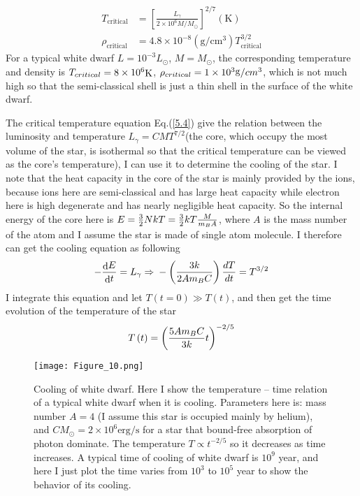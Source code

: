 \documentclass[preprint]{revtex4-1}
\begin{document}
\begin{align}
T_{\text{critical}}&=[\frac{L_{\gamma}}{2\times10^6M/M_{\odot}}]^{2/7}(\text{K}) \label{5.4}\\
\rho_{\text{critical}}&=4.8\times10^{-8}(\text{g}/\text{cm}^3)T_{\text{critical}}^{3/2} \label{5.5}
\end{align}
For a typical white dwarf $L=10^{-3}L_{\odot}$, $M=M_{\odot}$, the corresponding temperature and density is ${T_{critical}} = 8 \times {10^6}{\mathop{\rm K}\nolimits} $, ${\rho _{critical}} = 1 \times {10^3}{\mathop{\rm g}\nolimits} /c{m^3}$, which is not much high so that the semi-classical shell is just a thin shell in the surface of the white dwarf.\par
The critical temperature equation Eq.(\ref{5.4}) give the relation between the luminosity and temperature ${L_\gamma } = CM{T^{7/2}}$(the core, which occupy the most volume of the star, is isothermal so that the critical temperature can be viewed as the core’s temperature), I can use it to determine the cooling of the star. I note that the heat capacity in the core of the star is mainly provided by the ions, because ions here are semi-classical and has large heat capacity while electron here is high degenerate and has nearly negligible heat capacity. So the internal energy of the core here is $E = {3 \over 2}NkT = {3 \over 2}kT{M \over {{m_B}A}}$, where $A$ is the mass number of the atom and I assume the star is made of single atom molecule. I therefore can get the cooling equation as following
\begin{equation}
 - {{{\mathop{\rm d}\nolimits} E} \over {{\mathop{\rm d}\nolimits} t}} = {L_\gamma }{\rm{    }} \Rightarrow {\rm{    }} - \left( {{{3k} \over {2A{m_B}C}}} \right){{dT} \over {dt}} = {T^{3/2}} \label{5.6}
\end{equation}
I integrate this equation and let $T\left( {t = 0} \right) \gg T\left( t \right)$, and then get the time evolution of the temperature of the star
\begin{equation}
T\left( t \right) = {\left( {{{5A{m_B}C} \over {3k}}t} \right)^{ - 2/5}} \label{5.7}
\end{equation}
\begin{figure}
	\centering   
	\texttt{[image: Figure\_10.png]}  
	\caption{Cooling of white dwarf. Here I show the temperature – time relation of a typical white dwarf when it is cooling. Parameters here is: mass number $A=4$ (I assume this star is occupied mainly by helium), and $CM_{\odot}=2\times10^{6}\text{erg}/\text{s}$ for a star that bound-free absorption of photon dominate. The temperature $T\propto t^{-2/5}$  so it decreases as time increases. A typical time of cooling of white dwarf is $10^9$  year, and here I just plot the time varies from $10^3$  to $10^5$  year to show the behavior of its cooling.} 
	\label{fig:10} 
\end{figure}
\end{document}
